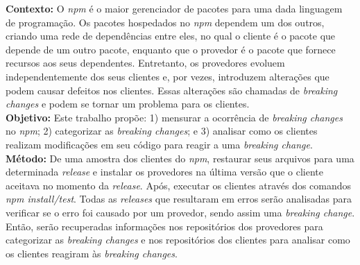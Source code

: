 \begin{resumo}

\textbf{Contexto:} O \textit{npm} é o maior gerenciador de pacotes para uma dada linguagem de programação. Os pacotes hospedados no \textit{npm} dependem um dos outros, criando uma rede de dependências entre eles, no qual o cliente é o pacote que depende de um outro pacote, enquanto que o provedor é o pacote que fornece recursos aos seus dependentes. Entretanto, os provedores evoluem independentemente dos seus clientes e, por vezes, introduzem alterações que podem causar defeitos nos clientes. Essas alterações são chamadas de \textit{breaking changes} e podem se tornar um problema para os clientes.\\
\textbf{Objetivo:} Este trabalho propõe: 1) mensurar a ocorrência de \textit{breaking changes} no \textit{npm}; 2) categorizar as \textit{breaking changes}; e 3) analisar como os clientes realizam modificações em seu código para reagir a uma \textit{breaking change}.\\
\textbf{Método:} De uma amostra dos clientes do \textit{npm}, restaurar seus arquivos para uma determinada \textit{release} e instalar os provedores na última versão que o cliente aceitava no momento da \textit{release}. Após, executar os clientes através dos comandos \textit{npm install/test}. Todas as \textit{releases} que resultaram em erros serão analisadas para verificar se o erro foi causado por um provedor, sendo assim uma \textit{breaking change}. Então, serão recuperadas informações nos repositórios dos provedores para categorizar as \textit{breaking changes} e nos repositórios dos clientes para analisar como os clientes reagiram às \textit{breaking changes}.\\

\end{resumo}
